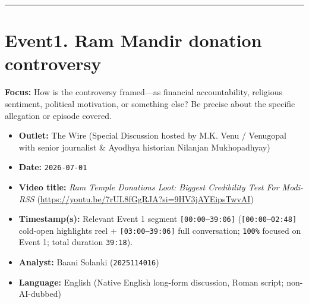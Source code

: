 \documentclass[10pt,a4paper]{article}
\begin{document}
\vspace{4pt}\noindent\rule{\textwidth}{0.4pt}\vspace{4pt}

\section*{Event1. Ram Mandir donation controversy}
\textbf{Focus:} How is the controversy framed---as financial accountability, religious sentiment, political motivation, or something else? Be precise about the specific allegation or episode covered.

\begin{itemize}[leftmargin=1.5em, itemsep=3pt, topsep=4pt]
  \item \textbf{Outlet:} The Wire (Special Discussion hosted by M.K. Venu / Venugopal with senior journalist \& Ayodhya historian Nilanjan Mukhopadhyay)
  \item \textbf{Date:} \texttt{2026-07-01}
  \item \textbf{Video title:} \textit{Ram Temple Donations Loot: Biggest Credibility Test For Modi-RSS} (\url{https://youtu.be/7rUL8fGgRJA?si=9HV3jAYEipsTwvAI})
  \item \textbf{Timestamp(s):} Relevant Event 1 segment \texttt{[00:00--39:06]} (\texttt{[00:00--02:48]} cold-open highlights reel + \texttt{[03:00--39:06]} full conversation; \texttt{100\%} focused on Event 1; total duration \texttt{39:18}).
  \item \textbf{Analyst:} Baani Solanki (\texttt{2025114016})
  \item \textbf{Language:} English (Native English long-form discussion, Roman script; non-AI-dubbed)
\end{itemize}
\end{document}
